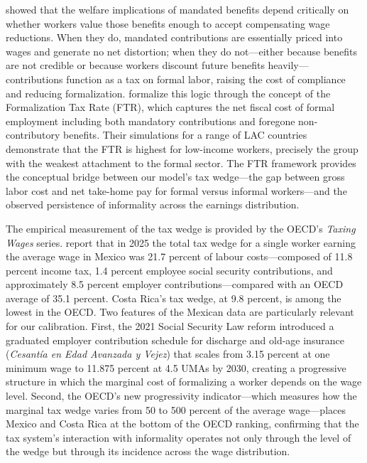 \documentclass[12pt,a4paper]{article}
\begin{document}
\citet{Summers1989} showed that the welfare implications of mandated benefits depend critically on whether workers value those benefits enough to accept compensating wage reductions. When they do, mandated contributions are essentially priced into wages and generate no net distortion; when they do not---either because benefits are not credible or because workers discount future benefits heavily---contributions function as a tax on formal labor, raising the cost of compliance and reducing formalization. \citet{WorldBankInformalizing2025} formalize this logic through the concept of the Formalization Tax Rate (FTR), which captures the net fiscal cost of formal employment including both mandatory contributions and foregone non-contributory benefits. Their simulations for a range of LAC countries demonstrate that the FTR is highest for low-income workers, precisely the group with the weakest attachment to the formal sector. The FTR framework provides the conceptual bridge between our model's tax wedge---the gap between gross labor cost and net take-home pay for formal versus informal workers---and the observed persistence of informality across the earnings distribution.

The empirical measurement of the tax wedge is provided by the OECD's \textit{Taxing Wages} series. \citet{OECDTaxingWages2026} report that in 2025 the total tax wedge for a single worker earning the average wage in Mexico was 21.7 percent of labour costs---composed of 11.8 percent income tax, 1.4 percent employee social security contributions, and approximately 8.5 percent employer contributions---compared with an OECD average of 35.1 percent. Costa Rica's tax wedge, at 9.8 percent, is among the lowest in the OECD. Two features of the Mexican data are particularly relevant for our calibration. First, the 2021 Social Security Law reform introduced a graduated employer contribution schedule for discharge and old-age insurance (\textit{Cesant\'ia en Edad Avanzada y Vejez}) that scales from 3.15 percent at one minimum wage to 11.875 percent at 4.5 UMAs by 2030, creating a progressive structure in which the marginal cost of formalizing a worker depends on the wage level. Second, the OECD's new progressivity indicator---which measures how the marginal tax wedge varies from 50 to 500 percent of the average wage---places Mexico and Costa Rica at the bottom of the OECD ranking, confirming that the tax system's interaction with informality operates not only through the level of the wedge but through its incidence across the wage distribution.
\end{document}
